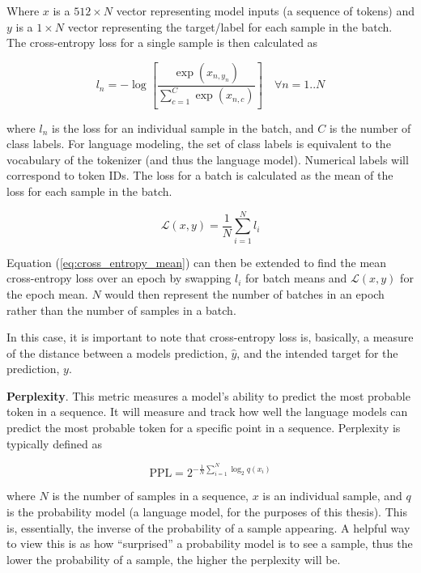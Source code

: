 \documentclass[12pt]{article}
\begin{document}
\noindent
Where $x$ is a $512 \times N$ vector representing model inputs (a sequence of tokens) and $y$ is a $1 \times N$ vector representing the target/label
for each sample in the batch. The cross-entropy loss for a single sample is then calculated as

\begin{equation}\label{eq:cross_entropy_loss}
    l_n = -\log \left[\frac{\exp(x_{n,y_n})}{\sum_{c=1}^{C}\exp(x_{n,c})}\right] \quad \forall n=1..N
\end{equation}

\noindent
where $l_n$ is the loss for an individual sample in the batch, and $C$ is the number of class labels. For language modeling, the set of class labels
is equivalent to the vocabulary of the tokenizer (and thus the language model). Numerical labels will correspond to token IDs. The loss for a batch is
calculated as the mean of the loss for each sample in the batch.

\begin{equation}\label{eq:cross_entropy_mean}
    \mathcal{L}(x, y) = \frac{1}{N}\sum_{i=1}^{N}l_i
\end{equation}

\noindent
Equation (\ref{eq:cross_entropy_mean}) can then be extended to find the mean cross-entropy loss over an epoch by swapping $l_i$ for batch means and
$\mathcal{L}(x, y)$ for the epoch mean. $N$ would then represent the number of batches in an epoch rather than the number of samples in a batch.

In this case, it is important to note that cross-entropy loss is, basically, a measure of the distance between a models prediction, $\hat{y}$, and the
intended target for the prediction, $y$.

\textbf{Perplexity}. This metric measures a model's ability to predict the most probable token in a sequence. It will measure and track how well the
language models can predict the most probable token for a specific point in a sequence. Perplexity is typically defined as

\begin{equation}\label{eq:ppl}
    \mbox{PPL} = 2^{-\frac{1}{N}\sum_{i=1}^{N} \log_2 q(x_i)}
\end{equation}

\noindent
where $N$ is the number of samples in a sequence, $x$ is an individual sample, and $q$ is the probability model (a language model, for the purposes of
this thesis). This is, essentially, the inverse of the probability of a sample appearing. A helpful way to view this is as how ``surprised'' a
probability model is to see a sample, thus the lower the probability of a sample, the higher the perplexity will be.
\end{document}
